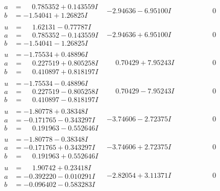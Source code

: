 \documentclass[1p]{elsarticle_modified}
\theoremstyle{definition}
\begin{document}
$$\begin{array}{c|c|c}
\begin{aligned}
a &= \phantom{-}0.785352 + 0.143559 I \\
b &= -1.54041 + 1.26825 I\end{aligned}
 & -2.94636 - 6.95100 I & \phantom{-0.000000 } 0 \\ \hline\begin{aligned}
u &= \phantom{-}1.62131 - 0.77787 I \\
a &= \phantom{-}0.785352 - 0.143559 I \\
b &= -1.54041 - 1.26825 I\end{aligned}
 & -2.94636 + 6.95100 I & \phantom{-0.000000 } 0 \\ \hline\begin{aligned}
u &= -1.75534 + 0.48896 I \\
a &= \phantom{-}0.227519 + 0.805258 I \\
b &= \phantom{-}0.410897 + 0.818197 I\end{aligned}
 & \phantom{-}0.70429 + 7.95243 I & \phantom{-0.000000 } 0 \\ \hline\begin{aligned}
u &= -1.75534 - 0.48896 I \\
a &= \phantom{-}0.227519 - 0.805258 I \\
b &= \phantom{-}0.410897 - 0.818197 I\end{aligned}
 & \phantom{-}0.70429 - 7.95243 I & \phantom{-0.000000 } 0 \\ \hline\begin{aligned}
u &= -1.80778 + 0.38348 I \\
a &= -0.171765 - 0.343297 I \\
b &= \phantom{-}0.191963 - 0.552646 I\end{aligned}
 & -3.74606 - 2.72375 I & \phantom{-0.000000 } 0 \\ \hline\begin{aligned}
u &= -1.80778 - 0.38348 I \\
a &= -0.171765 + 0.343297 I \\
b &= \phantom{-}0.191963 + 0.552646 I\end{aligned}
 & -3.74606 + 2.72375 I & \phantom{-0.000000 } 0 \\ \hline\begin{aligned}
u &= \phantom{-}1.90742 + 0.23418 I \\
a &= -0.392220 - 0.010291 I \\
b &= -0.096402 - 0.583283 I\end{aligned}
 & -2.82054 + 3.11371 I & \phantom{-0.000000 } 0\\

\end{array}$$
\end{document}
